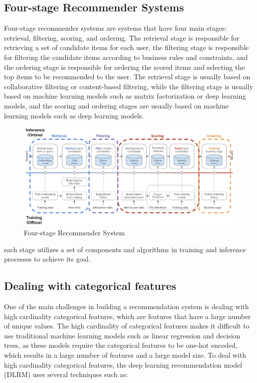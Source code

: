 \subsection{Four-stage Recommender Systems}
Four-stage recommender systems are systems that have four main stages: retrieval, filtering, scoring, and ordering. 
The retrieval stage is responsible for retrieving a set of candidate items for each user, 
the filtering stage is responsible for filtering the candidate items according to business rules and constraints,
and the ordering stage is responsible for ordering the scored items and selecting the top items to be recommended to the user. 
The retrieval stage is usually based on collaborative filtering or content-based filtering, while the filtering stage is 
usually based on machine learning models such as matrix factorization or deep learning models, and the scoring and ordering 
stages are usually based on machine learning models such as deep learning models.\cite{NvidiaRecSysBestPractices}
\begin{figure}[H]
    \centering
    \includegraphics[width=1\textwidth]{assets/Four_stage_rec_sys.png}
    \caption[Four-stage Recommender System]{Four-stage Recommender System\cite{NvidiaRecSysBestPractices}}
\end{figure}
each stage utilizes a set of components and algorithms in training and inference processes to achieve its goal.
\subsection{Dealing with categorical features}
One of the main challenges in building a recommendation system is dealing with high cardinality categorical features, which are features that have a large number of unique values. The high cardinality of categorical features makes it difficult to use traditional machine learning models such as linear regression and decision trees, as these models require the categorical features to be one-hot encoded, which results in a large number of features and a large model size. 
To deal with high cardinality categorical features, the deep learning recommendation model (DLRM) uses several techniques such as:
